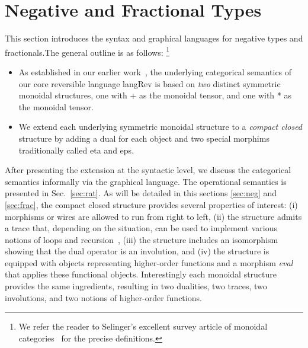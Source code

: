 \documentclass[preprint]{sigplanconf}
\newcommand{\xcomment}[2]{\textbf{#1:~\textsl{#2}}}
\newcommand{\roshan}[1]{\xcomment{Roshan}{#1}}
\newtheorem{proposition}[theorem]{Proposition}
\begin{document}



\section{Negative and Fractional Types}


This section introduces the syntax and graphical languages for
negative types and fractionals.The general outline is as follows:
\footnote{We refer the reader to Selinger's excellent survey
  article of monoidal
  categories~\cite{springerlink:10.1007/978-3-642-12821-94} for the precise
  definitions.}
\begin{itemize}
\item As established in our earlier work~\cite{rc2011,infeffects}, the
  underlying categorical semantics of our core reversible language
  {{langRev}} is based on \emph{two} distinct symmetric monoidal structures,
  one with {{+}} as the monoidal tensor, and one with {{*}} as the monoidal
  tensor.
\item We extend each underlying symmetric monoidal structure to a
  \emph{compact closed} structure by adding a dual for each object and two
  special morphims traditionally called {{eta}} and {{eps}}. 
\end{itemize}
After presenting the extension at the syntactic level, we discuss the
categorical semantics informally via the graphical language. The
operational semantics is presented in Sec.~\ref{sec:rat}. As will be
detailed in this sections \ref{sec:neg} and \ref{sec:frac}, the
compact closed structure provides several properties of interest: (i)
morphisms or wires are allowed to run from right to left, (ii) the
structure admits a trace that, depending on the situation, can be used
to implement various notions of loops and
recursion~\cite{joyal1996traced,Hasegawa:2009:TMC:1552068.1552069,Hasegawa:1997:RCS:645893.671607},
(iii) the structure includes an isomorphism showing that the dual
operator is an involution, and (iv) the structure is equipped with
objects representing higher-order functions and a morphism
\textit{eval} that applies these functional objects. Interestingly
each monoidal structure provides the same ingredients, resulting in
two dualities, two traces, two involutions, and two notions of
higher-order functions.
\end{document}
